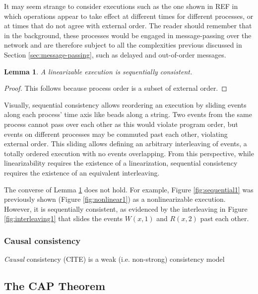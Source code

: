 \documentclass[]             %
{NASA}                       %
\newtheorem{lemma}[theorem]{Lemma}
\theoremstyle{definition}
\begin{document}
It may seem strange to consider executions such as the one shown in
REF in which operations appear to take effect at different times for
different processes, or at times that do not agree with external
order. The reader should remember that in the background, these
processes would be engaged in message-passing over the network and are
therefore subject to all the complexities previous discussed in
Section \ref{sec:message-passing}, such as delayed and out-of-order
messages.

\begin{lemma}
  \label{lem:linearsequential}
  A linearizable execution is sequentially consistent.
\end{lemma}
\begin{proof}
  This follows because process order is a subset of external order.
\end{proof}

Visually, sequential consistency allows reordering an execution by
sliding events along each process' time axis like beads along a
string.  Two events from the same process cannot pass over each other
as this would violate program order, but events on different processes
may be commuted past each other, violating external order. This
sliding allows defining an arbitrary interleaving of events, a totally
ordered execution with no events overlapping. From this perspective,
while linearizability requires the existence of a linearization,
sequential consistency requires the existence of an equivalent
interleaving.

The converse of Lemma \ref{lem:linearsequential} does not hold. For
example, Figure \ref{fig:sequential1} was previously shown (Figure
\ref{fig:nonlinear1}) as a nonlinearizable execution. However, it is
sequentially consistent, as evidenced by the interleaving in Figure
\ref{fig:interleaving1} that slides the events \(W(x,1)\) and \(R(x,2)\)
past each other.

\subsubsection{Causal consistency}
\label{causal-consistency}

\emph{Causal} consistency (CITE) is a weak (i.e. non-strong)
consistency model

\subsection{The CAP Theorem}
\label{the-cap-theorem}
\end{document}
